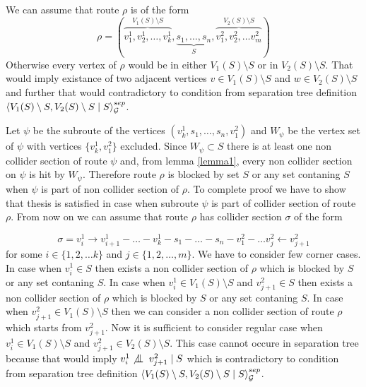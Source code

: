 \begin{prf}
	We can assume that route $\rho$ is of the form 
	\begin{equation}
		\rho = \left( 
				\overbrace{v^1_1, v^1_2, \dots, v^1_k}^{V_1(S) \setminus S}, 
				\underbrace{s_1, \dots, s_n}_{S}, 
				\overbrace{v^2_1, v^2_2, \dots v^2_m}^{V_2(S) \setminus S}  
			\right) 
	\end{equation}
	Otherwise every vertex of $\rho$ would be in either $V_1(S) \setminus S$ or in $V_2(S) \setminus S$. That would imply existance of
	two adjacent vertices $v \in V_1(S) \setminus S$ and $w \in V_2(S) \setminus S$ and further that would contradictory to condition from separation 
	tree definition $\left\langle V_1(S) \setminus S , V_2(S) \setminus S \mid S \right\rangle_{\mathcal{G}}^{sep}$.
	
	Let $\psi$ be the subroute of the vertices $(v^1_k, s_1, \dots, s_n, v^2_1)$ and $W_{\psi}$ be the vertex set of $\psi$ with vertices $\{v^1_k, v^2_1\}$
	excluded. Since $W_{\psi} \subset S$ there is at least one non collider section of route $\psi$ and, from lemma \ref{lemma1}, every non collider section on $\psi$
	is hit by $W_{\psi}$. Therefore route $\rho$ is blocked by set $S$ or any set contaning $S$ when $\psi$ is part of non collider section of $\rho$.
	To complete proof we have to show that thesis is satisfied in case when subroute $\psi$ is part of collider section of route $\rho$.
	From now on we can assume that route $\rho$ has collider section $\sigma$ of the form
	
	\begin{equation}
		\sigma = v^1_i \rightarrow v^1_{i+1} - \dots - v^1_k - s_1 - \dots - s_n - v^2_1 - \dots v^2_j \leftarrow v^2_{j+1} 
	\end{equation}
	for some $i \in \{1, 2, \dots k \}$ and $j \in \{ 1, 2, \dots, m\}$. We have to consider few corner cases. 
	In case when $v^1_{i} \in S$ then exists a non collider section of $\rho$ which is blocked by $S$ or any set contaning $S$. 
	In case when $v^1_{i} \in V_1(S) \setminus S$ and $v^2_{j+1} \in S$ then exists a non collider section of $\rho$ which is blocked by $S$ or any set contaning $S$.
	In case when $v^2_{j+1} \in V_1(S) \setminus S$ then we can consider a non collider section of route $\rho$ which starts from $v^2_{j+1}$.
	Now it is sufficient to consider regular case when $v^1_{i} \in V_1(S) \setminus S$ and $v^2_{j+1} \in V_2(S) \setminus S$. This case cannot occure
	in separation tree because that would imply $v^1_{i} \not \bigCI v^2_{j+1} \mid S$ which is contradictory to condition from separation tree definition
	$\left\langle V_1(S) \setminus S , V_2(S) \setminus S \mid S \right\rangle_{\mathcal{G}}^{sep}$. 
	\QED
\end{prf}


